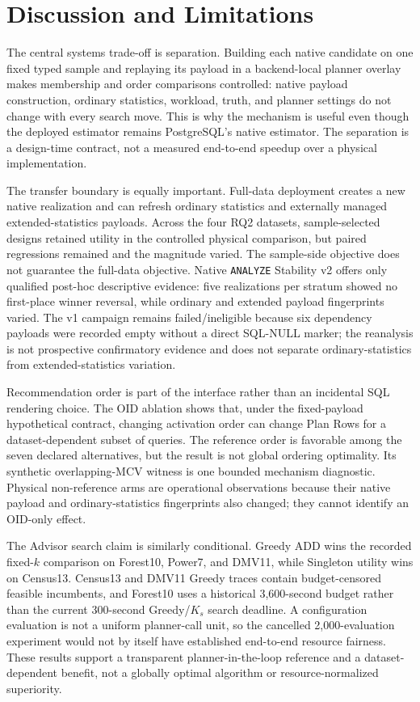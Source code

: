 \section{Discussion and Limitations}

The central systems trade-off is separation. Building each native candidate on
one fixed typed sample and replaying its payload in a backend-local planner
overlay makes membership and order comparisons controlled: native payload
construction, ordinary statistics, workload, truth, and planner settings do
not change with every search move. This is why the mechanism is useful even
though the deployed estimator remains PostgreSQL's native estimator. The
separation is a design-time contract, not a measured end-to-end speedup over a
physical implementation.

The transfer boundary is equally important. Full-data deployment creates a new
native realization and can refresh ordinary statistics and externally managed
extended-statistics payloads. Across the four RQ2 datasets, sample-selected
designs retained utility in the controlled physical comparison, but paired
regressions remained and the magnitude varied. The sample-side objective does
not guarantee the full-data objective. Native \texttt{ANALYZE} Stability v2
offers only qualified post-hoc descriptive evidence: five realizations per
stratum showed no first-place winner reversal, while ordinary and extended
payload fingerprints varied. The v1 campaign remains failed/ineligible because
six dependency payloads were recorded empty without a direct SQL-NULL marker;
the reanalysis is not prospective confirmatory evidence and does not separate
ordinary-statistics from extended-statistics variation.

Recommendation order is part of the interface rather than an incidental SQL
rendering choice. The OID ablation shows that, under the fixed-payload
hypothetical contract, changing activation order can change Plan Rows for a
dataset-dependent subset of queries. The reference order is favorable among
the seven declared alternatives, but the result is not global ordering
optimality. Its synthetic overlapping-MCV witness is one bounded mechanism
diagnostic. Physical non-reference arms are operational observations because
their native payload and ordinary-statistics fingerprints also changed; they
cannot identify an OID-only effect.

The Advisor search claim is similarly conditional. Greedy ADD wins the
recorded fixed-$k$ comparison on Forest10, Power7, and DMV11, while Singleton
utility wins on Census13. Census13 and DMV11 Greedy traces contain
budget-censored feasible incumbents, and Forest10 uses a historical
3,600-second budget rather than the current 300-second Greedy/$K_s$ search
deadline. A configuration evaluation is not a uniform planner-call unit, so
the cancelled 2,000-evaluation experiment would not by itself have established
end-to-end resource fairness. These results support a transparent
planner-in-the-loop reference and a dataset-dependent benefit, not a globally
optimal algorithm or resource-normalized superiority.

